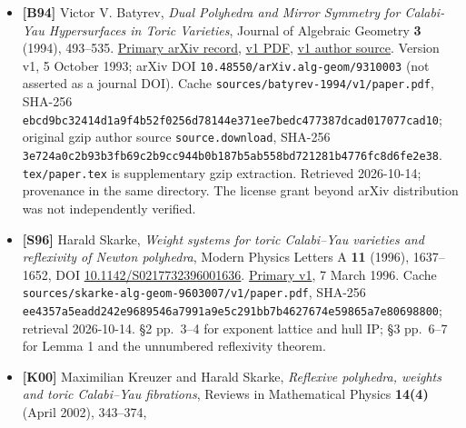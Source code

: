 \documentclass[11pt,a4paper,oneside]{report}
\providecommand{\tightlist}{%
  \setlength{\itemsep}{0pt}\setlength{\parskip}{0pt}}
\begin{document}
\begin{itemize}
\tightlist
\item
  \textbf{{[}B94{]}} Victor V. Batyrev, \emph{Dual Polyhedra and Mirror
  Symmetry for Calabi-Yau Hypersurfaces in Toric Varieties}, Journal of
  Algebraic Geometry \textbf{3} (1994), 493--535.
  \href{https://arxiv.org/abs/alg-geom/9310003}{Primary arXiv record},
  \href{https://arxiv.org/pdf/alg-geom/9310003v1}{v1 PDF},
  \href{https://arxiv.org/src/alg-geom/9310003v1}{v1 author source}.
  Version v1, 5 October 1993; arXiv DOI
  \texttt{10.\allowbreak{}48550/\allowbreak{}arXiv.\allowbreak{}alg-\allowbreak{}geom/\allowbreak{}9310003}
  (not asserted as a journal DOI). Cache
  \texttt{sources/\allowbreak{}batyrev-\allowbreak{}1994/\allowbreak{}v1/\allowbreak{}paper.\allowbreak{}pdf},
  SHA-256
  \texttt{ebcd9bc3\allowbreak{}2414d1a9\allowbreak{}f4b52f02\allowbreak{}56d78144\allowbreak{}e371ee7b\allowbreak{}edc47738\allowbreak{}7dcad017\allowbreak{}077cad10};
  original gzip author source \texttt{source.\allowbreak{}download},
  SHA-256
  \texttt{3e724a0c\allowbreak{}2b93b3fb\allowbreak{}69c2b9cc\allowbreak{}944b0b18\allowbreak{}7b5ab558\allowbreak{}bd721281\allowbreak{}b4776fc8\allowbreak{}d6fe2e38}.
  \texttt{tex/\allowbreak{}paper.\allowbreak{}tex} is supplementary gzip
  extraction. Retrieved 2026-10-14; provenance in the same directory.
  The license grant beyond arXiv distribution was not independently
  verified.
\item
  \textbf{{[}S96{]}} Harald Skarke, \emph{Weight systems for toric
  Calabi--Yau varieties and reflexivity of Newton polyhedra}, Modern
  Physics Letters A \textbf{11} (1996), 1637--1652, DOI
  \href{https://doi.org/10.1142/S0217732396001636}{10.\allowbreak{}1142/\allowbreak{}S0217732\allowbreak{}39600163\allowbreak{}6}.
  \href{https://arxiv.org/abs/alg-geom/9603007v1}{Primary v1}, 7 March
  1996. Cache
  \texttt{sources/\allowbreak{}skarke-\allowbreak{}alg-\allowbreak{}geom-\allowbreak{}9603007/\allowbreak{}v1/\allowbreak{}paper.\allowbreak{}pdf},
  SHA-256
  \texttt{ee4357a5\allowbreak{}eadd242e\allowbreak{}9689546a\allowbreak{}7991a9e5\allowbreak{}c291bb7b\allowbreak{}4627674e\allowbreak{}59865a7e\allowbreak{}80698800};
  retrieval 2026-10-14. §2 pp.~3--4 for exponent lattice and hull IP; §3
  pp.~6--7 for Lemma 1 and the unnumbered reflexivity theorem.
\item
  \textbf{{[}K00{]}} Maximilian Kreuzer and Harald Skarke,
  \emph{Reflexive polyhedra, weights and toric Calabi--Yau fibrations},
  Reviews in Mathematical Physics \textbf{14(4)} (April 2002), 343--374,

\end{itemize}
\end{document}
